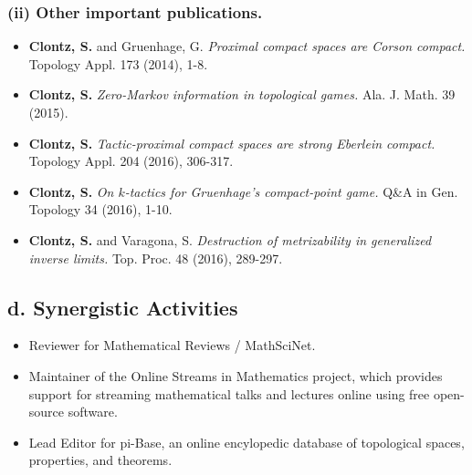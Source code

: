 \documentclass{article}
\begin{document}
\subsubsection*{(ii) Other important publications.}
\begin{itemize}

  \item \textbf{Clontz, S.} and Gruenhage, G.
    \textit{Proximal compact spaces are Corson compact.}
    Topology Appl. 173 (2014), 1-8.
  \item \textbf{Clontz, S.}
    \textit{Zero-Markov information in topological games.}
    Ala. J. Math. 39 (2015).
  \item \textbf{Clontz, S.}
    \textit{Tactic-proximal compact spaces are strong Eberlein compact.}
    Topology Appl. 204 (2016), 306-317.
  \item \textbf{Clontz, S.}
    \textit{On \(k\)-tactics for Gruenhage's compact-point game.}
    Q\&A in Gen. Topology 34 (2016), 1-10.
  \item \textbf{Clontz, S.} and Varagona, S.
    \textit{Destruction of metrizability in generalized inverse limits.}
    Top. Proc. 48 (2016), 289-297.


\end{itemize}

\subsection*{d. Synergistic Activities}

\begin{itemize}%

  \item Reviewer for Mathematical Reviews / MathSciNet.
  \item Maintainer of the Online Streams in Mathematics project, which
  provides support for streaming mathematical talks and lectures online
  using free open-source software.
  \item Lead Editor for pi-Base, an online encylopedic database of
  topological spaces, properties, and theorems.




\end{itemize}
\end{document}
